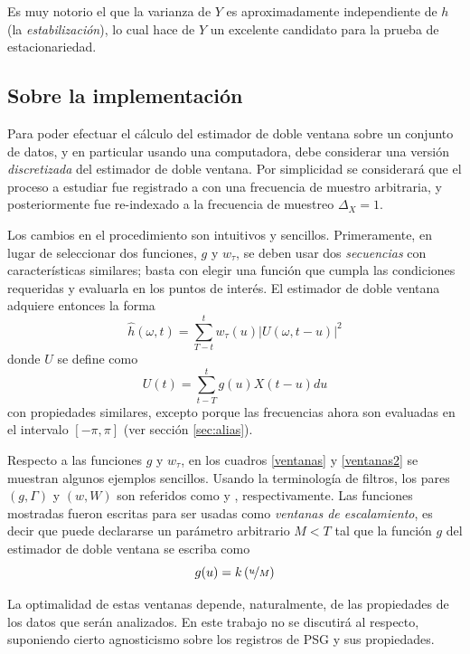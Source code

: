 \documentclass[12pt,letterpaper]{book}
\newcommand{\abso}[1]{\left| #1 \right|}
\begin{document}
Es muy notorio el que la varianza de $Y$ es aproximadamente independiente de $h$ (la \textit{estabilización}), lo cual hace de $Y$ un excelente candidato para la prueba de estacionariedad.

\subsection{Sobre la implementación}

Para poder efectuar el cálculo del estimador de doble ventana sobre un conjunto de datos, y en particular usando una computadora, debe considerar una versión \textit{discretizada} del estimador de doble ventana.
%
Por simplicidad se considerará que el proceso a estudiar fue registrado a con una frecuencia de muestro arbitraria, y posteriormente fue re-indexado a la frecuencia de muestreo $\Delta_X = 1$.

Los cambios en el procedimiento son intuitivos y sencillos.
%
Primeramente, en lugar de seleccionar dos funciones, $g$ y $w_\tau$, se deben usar dos \textit{secuencias} con características similares; basta con elegir una función que cumpla las condiciones requeridas y evaluarla en  los puntos de interés.
%
El estimador de doble ventana adquiere entonces la forma
\begin{equation}
\widehat{h}(\omega, t) = \sum_{T-t}^{t} w_\tau (u) \abso{U(\omega,t-u)}^{2}
\end{equation}
donde $U$ se define como
\begin{equation}
U(t) = \sum_{t-T}^{t} g(u) X(t-u) du
\end{equation}
con propiedades similares, excepto porque las frecuencias ahora son evaluadas en el intervalo $[-\pi,\pi]$ (ver sección \ref{sec:alias}).

Respecto a las funciones $g$ y $w_\tau$, en los cuadros \ref{ventanas} y \ref{ventanas2} se muestran algunos ejemplos sencillos.
%
Usando la terminología de filtros, los pares $(g,\Gamma)$ y $(w,W)$ son referidos como \underline{} y \underline{}, respectivamente.
%
Las funciones mostradas fueron escritas para ser usadas como \textit{ventanas de escalamiento}, es decir que puede declararse un parámetro arbitrario $M<T$ tal que la función $g$ del estimador de doble ventana se escriba como
\begin{equation}
g(u) = k\left( \nicefrac{u}{M} \right)
\end{equation}

%
La optimalidad de estas ventanas depende, naturalmente, de las propiedades de los datos que serán analizados. 
%
En este trabajo no se discutirá al respecto, suponiendo cierto agnosticismo sobre los registros de PSG y sus propiedades.
\end{document}
